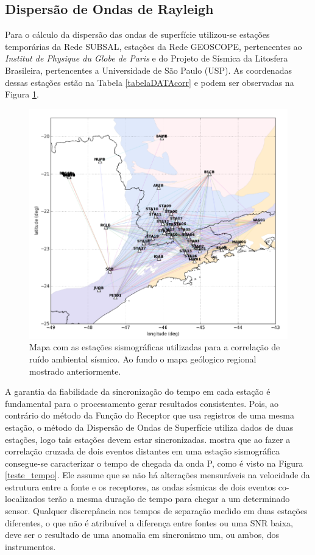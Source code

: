 \subsection{Dispersão de Ondas de Rayleigh}

Para o cálculo da dispersão das ondas de superfície utilizou-se estações temporárias da Rede SUBSAL, estações da Rede GEOSCOPE, pertencentes ao \textit{Institut de Physique du Globe de Paris} e do Projeto de Sísmica  da Litosfera Brasileira, pertencentes a Universidade de São Paulo (USP). As coordenadas dessas estações estão na Tabela \ref{tabelaDATAcorr} e podem ser observadas na Figura \ref{STA_corr}.

\begin{figure}[!ht]
\centering
\includegraphics[scale=0.5]{Figs/sta_corr.png}
\caption[Mapa com as estações sismográficas utilizadas para a correlação de ruído ambiental sísmico]{Mapa com as estações sismográficas utilizadas para a correlação de ruído ambiental sísmico. Ao fundo o mapa geólogico regional mostrado anteriormente.}
\label{STA_corr}
\end{figure}

A garantia da fiabilidade da sincronização do tempo em cada estação é fundamental para o processamento gerar resultados consistentes. Pois, ao contrário do método da Função do Receptor que usa registros de uma mesma estação, o método da Dispersão de Ondas de Superfície utiliza dados de duas estações, logo tais estações devem estar sincronizadas. \cite{gibbons_identification_2006} mostra que ao fazer a correlação cruzada de dois eventos distantes em uma estação sismográfica consegue-se caracterizar o tempo de chegada da onda P, como é visto na Figura \ref{teste_tempo}. Ele assume que se não há alterações mensuráveis na velocidade da estrutura entre a fonte e os receptores, as ondas sísmicas de dois eventos co-localizados terão a mesma duração de tempo para chegar a um determinado sensor. Qualquer discrepância nos tempos de separação medido em duas estações diferentes, o que não é atribuível a diferença entre fontes ou uma SNR baixa, deve ser o resultado de uma anomalia em sincronismo um, ou ambos, dos instrumentos.

